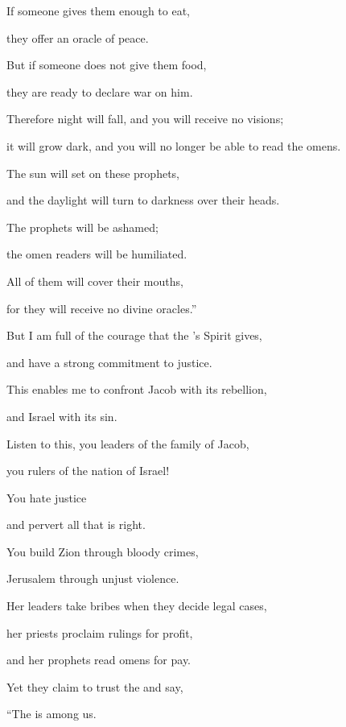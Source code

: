 {\par }{\Q If someone gives them enough to eat,
\par }{\Q they offer
an oracle
of peace.
\par }{\Q But if someone does not
give
them food,
\par }{\Q they are ready to declare
war
on him.
\par }{\Q {}Therefore
night
will fall, and you will receive no visions;
\par }{\Q it will grow dark,
and you will no longer be able to read the omens.
\par }{\Q The sun
will set
on
these prophets,
\par }{\Q and the daylight
will turn to darkness
over their heads.
\par }{\Q {}The prophets
will be ashamed;
\par }{\Q the omen
readers
will be humiliated.
\par }{\Q All
of them will cover their mouths,
\par }{\Q for
they will receive no
divine
oracles.”
\par }{\Q {}But
I am
full
of the courage
that the
{}’s
Spirit
gives,
\par }{\Q and have a strong
commitment to justice.
\par }{\Q This enables me to confront
Jacob
with its rebellion,
\par }{\Q and Israel
with its sin.
\par }{\Q {}Listen
to this,
you leaders
of the family
of Jacob,
\par }{\Q you rulers
of the nation
of Israel!
\par }{\Q You hate
justice
\par }{\Q and pervert
all
that is right.
\par }{\Q {}You build
Zion
through bloody
crimes,

\par }{\Q Jerusalem
through unjust violence.
\par }{\Q {}Her leaders
take bribes
when they decide
legal cases,

\par }{\Q her priests
proclaim
rulings for profit,
\par }{\Q and her prophets
read omens
for
pay.
\par }{\Q Yet they claim to trust
the {}
and say,
\par }{\Q “The
{}
is among
us.

}
